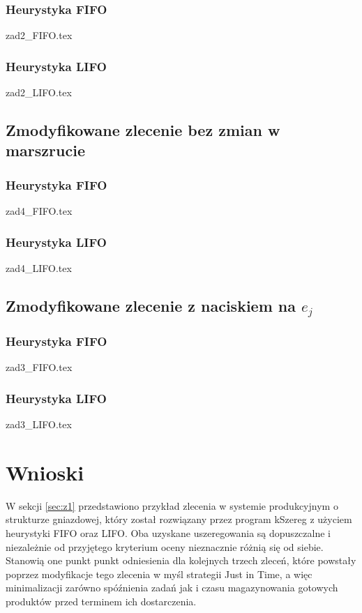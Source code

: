 \documentclass[twoside]{kInzynierka}
\begin{document}
\subsubsection  {Heurystyka FIFO}
\label{sec:z2f}
 {zad2_FIFO.tex}
\subsubsection  {Heurystyka LIFO}
\label{sec:z2l}
 {zad2_LIFO.tex}

\newpage
\subsection     {Zmodyfikowane zlecenie bez zmian w marszrucie}
\label{sec:z3}
\subsubsection  {Heurystyka FIFO}
\label{sec:z3f}
 {zad4_FIFO.tex}
\subsubsection  {Heurystyka LIFO}
\label{sec:z3l}
 {zad4_LIFO.tex}

\newpage
\subsection     {Zmodyfikowane zlecenie z naciskiem na $e_j$ }
\label{sec:z4}
\subsubsection  {Heurystyka FIFO}
\label{sec:z4f}
 {zad3_FIFO.tex}
\subsubsection  {Heurystyka LIFO}
\label{sec:z4l}
 {zad3_LIFO.tex}



\section        {Wnioski}
W sekcji \ref{sec:z1} przedstawiono przykład zlecenia w systemie produkcyjnym o strukturze gniazdowej, który został rozwiązany przez program kSzereg z użyciem heurystyki FIFO oraz LIFO. Oba uzyskane uszeregowania są dopuszczalne i niezależnie od przyjętego kryterium oceny nieznacznie różnią się od siebie. Stanowią one punkt punkt odniesienia dla kolejnych trzech zleceń, które powstały poprzez modyfikacje tego zlecenia w myśl strategii Just in Time, a więc minimalizacji zarówno spóźnienia zadań jak i czasu magazynowania gotowych produktów przed terminem ich dostarczenia. 
\end{document}
